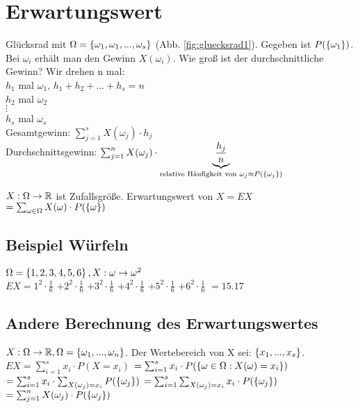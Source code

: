 \renewcommand{\ldate}{2015-11-02}

\section{Erwartungswert}
Glücksrad mit $\Omega =  \left\lbrace \omega_1, \omega_1, ..., \omega_s \right\rbrace  $ (Abb. \ref{fig:gluecksrad1}). Gegeben ist $P( \left\lbrace \omega_1 \right\rbrace )$. Bei $ \omega_i $ erhält man den Gewinn $ X(\omega_i) $. Wie groß ist der durchschnittliche Gewinn? Wir drehen n mal: \\
$h_1$ mal $\omega_1$, $h_1 + h_2 + ... + h_s = n$\\
$h_2$ mal $\omega_2$\\
$\vdots$\\
$h_s$ mal $\omega_s$\\
Gesamtgewinn: $\sum_{j=1}^{s} X(\omega_j) \cdot h_j$\\
Durchschnittsgewinn: $\sum_{j=1}^{n} X(\omega_j) \cdot \underbrace{\frac{h_j}{n}}_{\textrm{relative Häufigkeit von } \omega_j \approx P( \left\lbrace \omega_j \right\rbrace )  }$

\begin{defi}
$ X : \Omega \rightarrow \mathbb{R} $ ist Zufallsgröße.
Erwartungswert von 
$ X = E X $
$= \sum_{\omega \in \Omega} X(\omega) \cdot P( \left\lbrace \omega \right\rbrace )$
\end{defi}

\subsection{Beispiel Würfeln}
$\Omega =  \left\lbrace 1,2,3,4,5,6 \right\rbrace , X : \omega \rightarrow \omega^2$\\
$E X = 1^2 \cdot \frac{1}{6} $
$+ 2^2 \cdot \frac{1}{6} $
$+ 3^2 \cdot \frac{1}{6} $
$+ 4^2 \cdot \frac{1}{6} $
$+ 5^2 \cdot \frac{1}{6} $
$+ 6^2 \cdot \frac{1}{6} $
$= 15.17$

\subsection{Andere Berechnung des Erwartungswertes}
$ X : \Omega \rightarrow \mathbb{R}, \Omega = \left\lbrace \omega_1, ..., \omega_n \right\rbrace  $. Der Wertebereich von X sei: $ \left\lbrace x_1, ..., x_s \right\rbrace $.\\
$E X = \sum_{i=1}^{s} x_i \cdot P(X=x_i) $
$=\sum_{i=1}^{s} x_i \cdot P( \left\lbrace \omega \in \Omega : X(\omega) = x_i \right\rbrace ) $
$= \sum_{i=1}^{s} x_i \cdot \sum_{X(\omega_j)=x_i} P( \left\lbrace \omega_j \right\rbrace ) $
$= \sum_{i=1}^{s} \sum_{X(\omega_j)=x_i} x_i \cdot P( \left\lbrace \omega_j \right\rbrace ) $
$=\sum_{j=1}^{n} X(\omega_j) \cdot P( \left\lbrace \omega_j \right\rbrace )$

